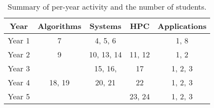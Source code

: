 
\begin{table}
\centering
\begin{tabular}{|c|c|c|c|c|}
  \toprule
  {\bf Year} & {\bf Algorithms} & {\bf Systems} & {\bf HPC}  & {\bf Applications}\\
  \midrule
  Year 1 & 7 & 4, 5, 6 & & 1, 8 \\
  Year 2 & 9 & 10, 13, 14 & 11, 12 & 1, 2 \\
  Year 3 &  & 15, 16,  & 17 & 1, 2, 3 \\
  Year 4 & 18, 19 & 20, 21 & 22 & 1, 2, 3 \\
  Year 5 &  & & 23, 24 & 1, 2, 3 \\
  \bottomrule
\end{tabular}
\caption{Summary of per-year activity and the number of students.}
\label{tab:timneline}
\vspace{-0.3cm}
\end{table}


\iffalse
{}

